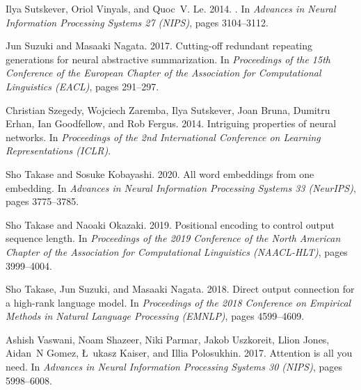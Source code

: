 \documentclass[11pt]{article}
\begin{document}
\begin{thebibliography}{47}
Ilya Sutskever, Oriol Vinyals, and Quoc~V. Le. 2014.
.
\newblock In \emph{Advances in Neural Information Processing Systems 27
  (NIPS)}, pages 3104--3112.

Jun Suzuki and Masaaki Nagata. 2017.
\newblock Cutting-off redundant repeating generations for neural abstractive
  summarization.
\newblock In \emph{Proceedings of the 15th Conference of the {E}uropean Chapter
  of the Association for Computational Linguistics (EACL)}, pages 291--297.

Christian Szegedy, Wojciech Zaremba, Ilya Sutskever, Joan Bruna, Dumitru Erhan,
  Ian Goodfellow, and Rob Fergus. 2014.
\newblock Intriguing properties of neural networks.
\newblock In \emph{Proceedings of the 2nd International Conference on Learning
  Representations (ICLR)}.

Sho Takase and Sosuke Kobayashi. 2020.
\newblock All word embeddings from one embedding.
\newblock In \emph{Advances in Neural Information Processing Systems 33
  (NeurIPS)}, pages 3775--3785.

Sho Takase and Naoaki Okazaki. 2019.
\newblock Positional encoding to control output sequence length.
\newblock In \emph{Proceedings of the 2019 Conference of the North {A}merican
  Chapter of the Association for Computational Linguistics (NAACL-HLT)}, pages
  3999--4004.

Sho Takase, Jun Suzuki, and Masaaki Nagata. 2018.
\newblock Direct output connection for a high-rank language model.
\newblock In \emph{Proceedings of the 2018 Conference on Empirical Methods in
  Natural Language Processing (EMNLP)}, pages 4599--4609.

Ashish Vaswani, Noam Shazeer, Niki Parmar, Jakob Uszkoreit, Llion Jones,
  Aidan~N Gomez, \L~ukasz Kaiser, and Illia Polosukhin. 2017.
\newblock Attention is all you need.
\newblock In \emph{Advances in Neural Information Processing Systems 30
  (NIPS)}, pages 5998--6008.


\end{thebibliography}
\end{document}
